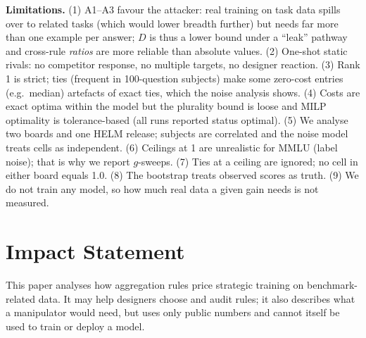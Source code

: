 \documentclass{article}
\theoremstyle{plain}
\theoremstyle{definition}
\theoremstyle{remark}
\begin{document}
\textbf{Limitations.} (1) A1--A3 favour the attacker: real training on task data spills over to related tasks (which would lower breadth further) but needs far more than one example per answer; $D$ is thus a lower bound under a ``leak'' pathway and cross-rule \emph{ratios} are more reliable than absolute values. (2) One-shot static rivals: no competitor response, no multiple targets, no designer reaction. (3) Rank 1 is strict; ties (frequent in 100-question subjects) make some zero-cost entries (e.g.\ median) artefacts of exact ties, which the noise analysis shows. (4) Costs are exact optima within the model but the plurality bound is loose and MILP optimality is tolerance-based (all runs reported status optimal). (5) We analyse two boards and one HELM release; subjects are correlated and the noise model treats cells as independent. (6) Ceilings at 1 are unrealistic for MMLU (label noise); that is why we report $g$-sweeps. (7) Ties at a ceiling are ignored; no cell in either board equals 1.0. (8) The bootstrap treats observed scores as truth. (9) We do not train any model, so how much real data a given gain needs is not measured.

\section*{Impact Statement}
This paper analyses how aggregation rules price strategic training on benchmark-related data. It may help designers choose and audit rules; it also describes what a manipulator would need, but uses only public numbers and cannot itself be used to train or deploy a model.




\newpage
\appendix
\onecolumn

\end{document}
